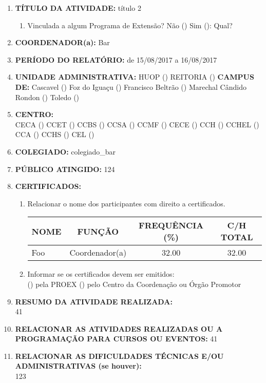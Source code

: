 \documentclass[12pt,a4paper,oneside]{article}%
\begin{document}
\begin{enumerate}%
\item%
\textbf{TÍTULO DA ATIVIDADE: }%
título 2%
\begin{enumerate}%
\item%
Vinculada a algum Programa de Extensão? %
Não () Sim (): Qual? %
\end{enumerate}%
\item%
\textbf{COORDENADOR(a): }%
Bar%
\item%
\textbf{PERÍODO DO RELATÓRIO: }%
de 15/08/2017 a 16/08/2017%
\item%
\textbf{UNIDADE ADMINISTRATIVA: }%
HUOP () %
REITORIA () %
\newline%
\textbf{CAMPUS DE: }%
Cascavel () %
Foz do Iguaçu () %
Francisco Beltrão () %
Marechal Cândido Rondon () %
Toledo () %
\item%
\textbf{CENTRO: \\}%
CECA () %
CCET () %
CCBS () %
CCSA () %
CCMF () %
CECE () %
CCH () %
CCHEL () %
CCA () %
CCHS () %
CEL () %
\item%
\textbf{COLEGIADO: }%
colegiado\_bar%
\item%
\textbf{PÚBLICO ATINGIDO: }%
124%
\item%
\textbf{CERTIFICADOS: }%
\begin{enumerate}%
\item%
Relacionar o nome dos participantes com direito a certificados. \\%
\begin{tabularx}{\linewidth}{|>{\centering\arraybackslash}X|
                                  @{    }c@{    }|
                                  @{    }c@{    }|
                                  @{    }c@{    }|
                              }%
\hline%
NOME&FUNÇÃO&FREQUÊNCIA (\%)&C/H TOTAL\\%
\hline%
Foo&Coordenador(a)&32.00&32.00\\%
\hline%
\end{tabularx}%
\linebreak%
\item%
Informar se os certificados devem ser emitidos: \\%
() pela PROEX \hfill () pelo Centro da Coordenação ou Órgão Promotor%
\end{enumerate}%
\item%
\textbf{RESUMO DA ATIVIDADE REALIZADA: \\}%
41%
\item%
\textbf{RELACIONAR AS ATIVIDADES REALIZADAS OU A PROGRAMAÇÃO PARA CURSOS OU EVENTOS: }%
41%
\item%
\textbf{RELACIONAR AS DIFICULDADES TÉCNICAS E/OU ADMINISTRATIVAS (se houver): \\}%
123%
\end{enumerate}%
\end{document}
